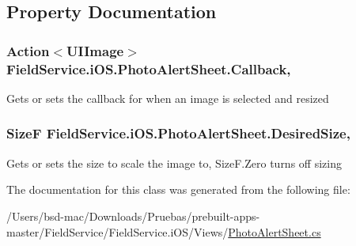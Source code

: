 \subsection{Property Documentation}
\hypertarget{class_field_service_1_1i_o_s_1_1_photo_alert_sheet_a765b9f7e442861e11108bdd8877438e8}{
\subsubsection[{Callback}]{\setlength{\rightskip}{0pt plus 5cm}Action$<$U\+I\+Image$>$ Field\+Service.\+i\+O\+S.\+Photo\+Alert\+Sheet.\+Callback\hspace{0.3cm}{\ttfamily [get]}, {\ttfamily [set]}}}\label{class_field_service_1_1i_o_s_1_1_photo_alert_sheet_a765b9f7e442861e11108bdd8877438e8}


Gets or sets the callback for when an image is selected and resized 

\hypertarget{class_field_service_1_1i_o_s_1_1_photo_alert_sheet_a1d1622d08aca2f57aea67787358549c8}{
\subsubsection[{Desired\+Size}]{\setlength{\rightskip}{0pt plus 5cm}Size\+F Field\+Service.\+i\+O\+S.\+Photo\+Alert\+Sheet.\+Desired\+Size\hspace{0.3cm}{\ttfamily [get]}, {\ttfamily [set]}}}\label{class_field_service_1_1i_o_s_1_1_photo_alert_sheet_a1d1622d08aca2f57aea67787358549c8}


Gets or sets the size to scale the image to, Size\+F.\+Zero turns off sizing 



The documentation for this class was generated from the following file\+:\begin{DoxyCompactItemize}
\item 
/\+Users/bsd-\/mac/\+Downloads/\+Pruebas/prebuilt-\/apps-\/master/\+Field\+Service/\+Field\+Service.\+i\+O\+S/\+Views/\hyperlink{_photo_alert_sheet_8cs}{Photo\+Alert\+Sheet.\+cs}\end{DoxyCompactItemize}
